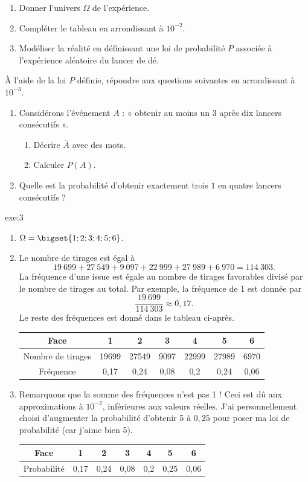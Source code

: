 {	\begin{enumerate}
		\item
		Donner l'univers $\Omega$ de l'expérience.
		\item
		Compléter le tableau en arrondissant à $10^{-2}$.
		\item
		Modéliser la réalité en définissant une loi de probabilité $P$ associée à l'expérience aléatoire du lancer de dé.
	\end{enumerate}
	À l'aide de la loi $P$ définie, répondre aux questions suivantes en arrondissant à $10^{-3}$.
	\begin{enumerate}[resume]
		\item Considérons l'événement $A$ : « obtenir au moins un $3$ après dix lancers consécutifs ».
			\begin{enumerate}
				\item Décrire $\overline{A}$ avec des mots.
				\item Calculer $P(A)$.
			\end{enumerate}
		\item Quelle est la probabilité d'obtenir exactement trois $1$ en quatre lancers consécutifs ?
	\end{enumerate}
}{exe:3}{
	\begin{enumerate}
		\item
		$\Omega = \bigset{1;2;3;4;5;6}$.
		\item
		Le nombre de tirages est égal à
			\[ 19~699 + 27~549 + 9~097 + 22~999 + 27~989 + 6~970 = 114~303. \]
		La fréquence d'une issue est égale au nombre de tirages favorables divisé par le nombre de tirages au total.
		Par exemple, la fréquence de 1 est donnée par
			\[ \frac{19~699}{114~303} \approx 0,17. \]
		Le reste des fréquences est donné dans le tableau ci-après.
		\begin{center}
		\begin{tabular}{|c|c|c|c|c|c|c|} \hline
			Face & 1 & 2 & 3 & 4 & 5 & 6 \\ \hline
			Nombre de tirages & 19699 & 27549 & 9097 & 22999 & 27989 & 6970  \\ \hline
			Fréquence & 0,17 & 0,24 & 0,08 & 0,2 & 0,24 &  0,06 \\ \hline
		\end{tabular}
		\end{center}
		\item
		Remarquons que la somme des fréquences n'est pas 1 ! Ceci est dû aux approximations à $10^{-2}$, inférieures aux valeurs réelles.
		J'ai personnellement choisi d'augmenter la probabilité d'obtenir 5 à $0,25$ pour poser ma loi de probabilité (car j'aime bien 5).
		\begin{center}
		\begin{tabular}{|c|c|c|c|c|c|c|} \hline
			Face & 1 & 2 & 3 & 4 & 5 & 6 \\ \hline
			Probabilité & 0,17 & 0,24 & 0,08 & 0,2 & 0,25 &  0,06 \\ \hline
		\end{tabular}
		\end{center}
		

\end{enumerate}}
